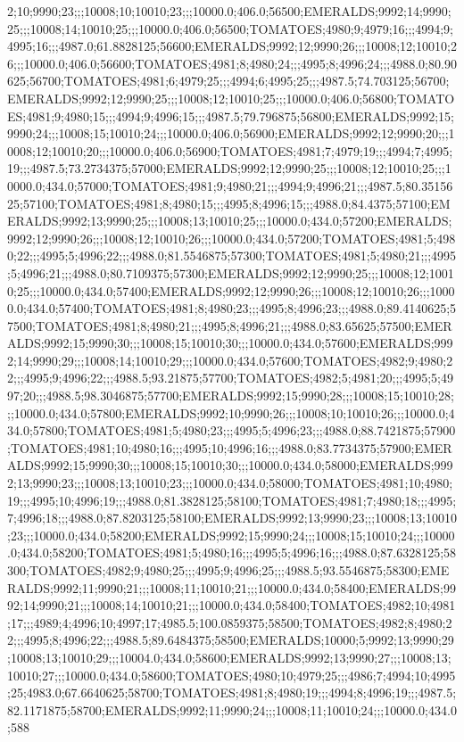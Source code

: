 2;10;9990;23;;;10008;10;10010;23;;;10000.0;406.0;56500;EMERALDS;9992;14;9990;25;;;10008;14;10010;25;;;10000.0;406.0;56500;TOMATOES;4980;9;4979;16;;;4994;9;4995;16;;;4987.0;61.8828125;56600;EMERALDS;9992;12;9990;26;;;10008;12;10010;26;;;10000.0;406.0;56600;TOMATOES;4981;8;4980;24;;;4995;8;4996;24;;;4988.0;80.90625;56700;TOMATOES;4981;6;4979;25;;;4994;6;4995;25;;;4987.5;74.703125;56700;EMERALDS;9992;12;9990;25;;;10008;12;10010;25;;;10000.0;406.0;56800;TOMATOES;4981;9;4980;15;;;4994;9;4996;15;;;4987.5;79.796875;56800;EMERALDS;9992;15;9990;24;;;10008;15;10010;24;;;10000.0;406.0;56900;EMERALDS;9992;12;9990;20;;;10008;12;10010;20;;;10000.0;406.0;56900;TOMATOES;4981;7;4979;19;;;4994;7;4995;19;;;4987.5;73.2734375;57000;EMERALDS;9992;12;9990;25;;;10008;12;10010;25;;;10000.0;434.0;57000;TOMATOES;4981;9;4980;21;;;4994;9;4996;21;;;4987.5;80.3515625;57100;TOMATOES;4981;8;4980;15;;;4995;8;4996;15;;;4988.0;84.4375;57100;EMERALDS;9992;13;9990;25;;;10008;13;10010;25;;;10000.0;434.0;57200;EMERALDS;9992;12;9990;26;;;10008;12;10010;26;;;10000.0;434.0;57200;TOMATOES;4981;5;4980;22;;;4995;5;4996;22;;;4988.0;81.5546875;57300;TOMATOES;4981;5;4980;21;;;4995;5;4996;21;;;4988.0;80.7109375;57300;EMERALDS;9992;12;9990;25;;;10008;12;10010;25;;;10000.0;434.0;57400;EMERALDS;9992;12;9990;26;;;10008;12;10010;26;;;10000.0;434.0;57400;TOMATOES;4981;8;4980;23;;;4995;8;4996;23;;;4988.0;89.4140625;57500;TOMATOES;4981;8;4980;21;;;4995;8;4996;21;;;4988.0;83.65625;57500;EMERALDS;9992;15;9990;30;;;10008;15;10010;30;;;10000.0;434.0;57600;EMERALDS;9992;14;9990;29;;;10008;14;10010;29;;;10000.0;434.0;57600;TOMATOES;4982;9;4980;22;;;4995;9;4996;22;;;4988.5;93.21875;57700;TOMATOES;4982;5;4981;20;;;4995;5;4997;20;;;4988.5;98.3046875;57700;EMERALDS;9992;15;9990;28;;;10008;15;10010;28;;;10000.0;434.0;57800;EMERALDS;9992;10;9990;26;;;10008;10;10010;26;;;10000.0;434.0;57800;TOMATOES;4981;5;4980;23;;;4995;5;4996;23;;;4988.0;88.7421875;57900;TOMATOES;4981;10;4980;16;;;4995;10;4996;16;;;4988.0;83.7734375;57900;EMERALDS;9992;15;9990;30;;;10008;15;10010;30;;;10000.0;434.0;58000;EMERALDS;9992;13;9990;23;;;10008;13;10010;23;;;10000.0;434.0;58000;TOMATOES;4981;10;4980;19;;;4995;10;4996;19;;;4988.0;81.3828125;58100;TOMATOES;4981;7;4980;18;;;4995;7;4996;18;;;4988.0;87.8203125;58100;EMERALDS;9992;13;9990;23;;;10008;13;10010;23;;;10000.0;434.0;58200;EMERALDS;9992;15;9990;24;;;10008;15;10010;24;;;10000.0;434.0;58200;TOMATOES;4981;5;4980;16;;;4995;5;4996;16;;;4988.0;87.6328125;58300;TOMATOES;4982;9;4980;25;;;4995;9;4996;25;;;4988.5;93.5546875;58300;EMERALDS;9992;11;9990;21;;;10008;11;10010;21;;;10000.0;434.0;58400;EMERALDS;9992;14;9990;21;;;10008;14;10010;21;;;10000.0;434.0;58400;TOMATOES;4982;10;4981;17;;;4989;4;4996;10;4997;17;4985.5;100.0859375;58500;TOMATOES;4982;8;4980;22;;;4995;8;4996;22;;;4988.5;89.6484375;58500;EMERALDS;10000;5;9992;13;9990;29;10008;13;10010;29;;;10004.0;434.0;58600;EMERALDS;9992;13;9990;27;;;10008;13;10010;27;;;10000.0;434.0;58600;TOMATOES;4980;10;4979;25;;;4986;7;4994;10;4995;25;4983.0;67.6640625;58700;TOMATOES;4981;8;4980;19;;;4994;8;4996;19;;;4987.5;82.1171875;58700;EMERALDS;9992;11;9990;24;;;10008;11;10010;24;;;10000.0;434.0;588